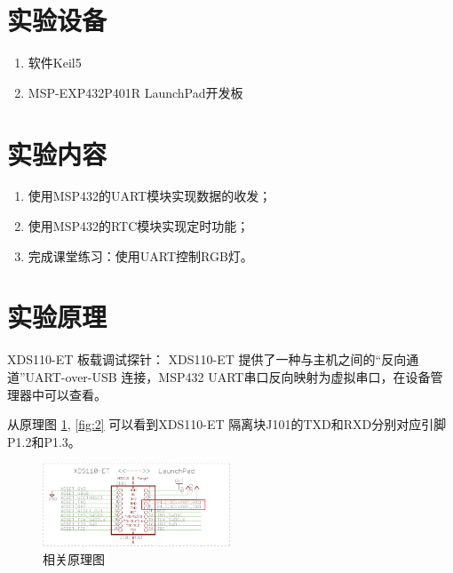\documentclass[a4paper,10pt,UTF8]{paper}
\numberwithin{equation}{section}
\numberwithin{figure}{section}
\begin{document}
\section{实验设备}

\begin{enumerate}
  \item 软件Keil5
  \item MSP-EXP432P401R LaunchPad开发板
\end{enumerate}


\section{实验内容}

\begin{enumerate}
  \item 使用MSP432的UART模块实现数据的收发；
  \item 使用MSP432的RTC模块实现定时功能；
  \item 完成课堂练习：使用UART控制RGB灯。
\end{enumerate}

\section{实验原理}

XDS110-ET 板载调试探针：
XDS110-ET 提供了一种与主机之间的“反向通道”UART-over-USB 连接，MSP432 UART串口反向映射为虚拟串口，在设备管理器中可以查看。

从原理图 \ref{fig:1}, \ref{fig:2} 可以看到XDS110-ET 隔离块J101的TXD和RXD分别对应引脚P1.2和P1.3。

\begin{figure}[h]
  \centering
  \includegraphics[width=0.5\textwidth]{img/1.PNG}
  \caption{相关原理图}
  \label{fig:1}
\end{figure}
\end{document}
